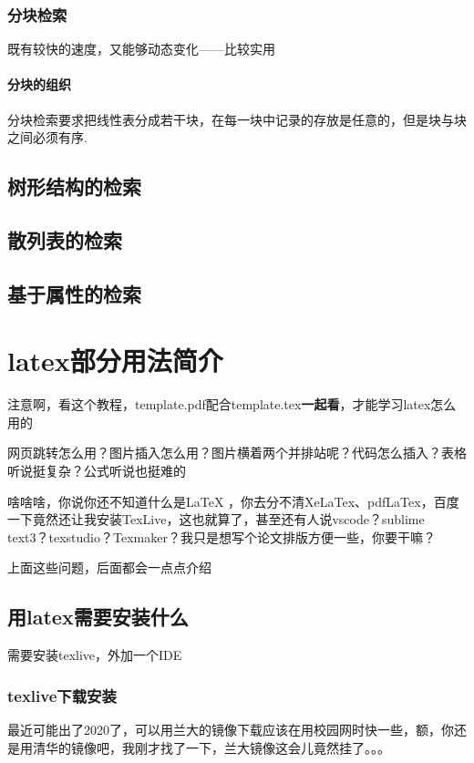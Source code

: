 \documentclass[AutoFakeBold]{LZUThesis2007}
\begin{document}
		\subsection{分块检索}
既有较快的速度，又能够动态变化——比较实用
			\subsubsection{分块的组织}
分块检索要求把线性表分成若干块，在每一块中记录的存放是任意的，但是块与块之间必须有序.
	\section{树形结构的检索}
	\section{散列表的检索}
	\section{基于属性的检索}

















\chapter{latex部分用法简介}

注意啊，看这个教程，template.pdf配合template.tex\textbf{一起看}，才能学习latex怎么用的

网页跳转怎么用？图片插入怎么用？图片横着两个并排站呢？代码怎么插入？表格听说挺复杂？公式听说也挺难的

啥啥啥，你说你还不知道什么是LaTeX ，你去分不清XeLaTex、pdfLaTex，百度一下竟然还让我安装TexLive，这也就算了，甚至还有人说vscode？sublime text3？texstudio？Texmaker？我只是想写个论文排版方便一些，你要干嘛？

上面这些问题，后面都会一点点介绍

\section{用latex需要安装什么}
需要安装texlive，外加一个IDE

\subsection{texlive下载安装}
最近可能出了2020了，可以用兰大的镜像下载应该在用校园网时快一些，额，你还是用清华的镜像吧，我刚才找了一下，兰大镜像这会儿竟然挂了。。。
\end{document}
